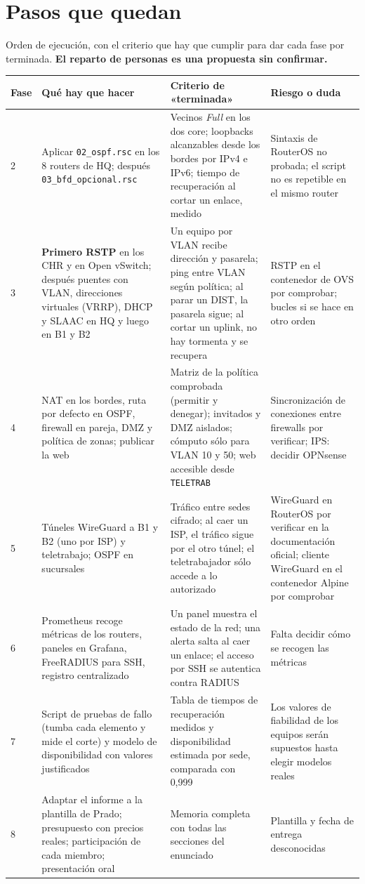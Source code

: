 \documentclass[11pt,a4paper]{article}
\newcommand{\cod}[1]{\texttt{#1}}
\begin{document}
\section{Pasos que quedan}\label{sec:pasos}
Orden de ejecución, con el criterio que hay que cumplir para dar cada fase por terminada. \textbf{El reparto de personas es una propuesta sin confirmar.}
\begingroup\footnotesize
\begin{longtable}{@{}p{1.2cm}p{5cm}p{6.6cm}p{3.7cm}@{}}
\toprule
\textbf{Fase} & \textbf{Qué hay que hacer} & \textbf{Criterio de «terminada»} & \textbf{Riesgo o duda}\\
\midrule
\endhead
2 & Aplicar \cod{02\_ospf.rsc} en los 8 routers de HQ; después \cod{03\_bfd\_opcional.rsc} & Vecinos \textit{Full} en los dos core; loopbacks alcanzables desde los bordes por IPv4 e IPv6; tiempo de recuperación al cortar un enlace, medido & Sintaxis de RouterOS no probada; el script no es repetible en el mismo router\\
3 & \textbf{Primero RSTP} en los CHR y en Open vSwitch; después puentes con VLAN, direcciones virtuales (VRRP), DHCP y SLAAC en HQ y luego en B1 y B2 & Un equipo por VLAN recibe dirección y pasarela; ping entre VLAN según política; al parar un DIST, la pasarela sigue; al cortar un uplink, no hay tormenta y se recupera & RSTP en el contenedor de OVS por comprobar; bucles si se hace en otro orden\\
4 & NAT en los bordes, ruta por defecto en OSPF, firewall en pareja, DMZ y política de zonas; publicar la web & Matriz de la política comprobada (permitir y denegar); invitados y DMZ aislados; cómputo sólo para VLAN 10 y 50; web accesible desde \cod{TELETRAB} & Sincronización de conexiones entre firewalls por verificar; IPS: decidir OPNsense\\
5 & Túneles WireGuard a B1 y B2 (uno por ISP) y teletrabajo; OSPF en sucursales & Tráfico entre sedes cifrado; al caer un ISP, el tráfico sigue por el otro túnel; el teletrabajador sólo accede a lo autorizado & WireGuard en RouterOS por verificar en la documentación oficial; cliente WireGuard en el contenedor Alpine por comprobar\\
6 & Prometheus recoge métricas de los routers, paneles en Grafana, FreeRADIUS para SSH, registro centralizado & Un panel muestra el estado de la red; una alerta salta al caer un enlace; el acceso por SSH se autentica contra RADIUS & Falta decidir cómo se recogen las métricas\\
7 & Script de pruebas de fallo (tumba cada elemento y mide el corte) y modelo de disponibilidad con valores justificados & Tabla de tiempos de recuperación medidos y disponibilidad estimada por sede, comparada con 0,999 & Los valores de fiabilidad de los equipos serán supuestos hasta elegir modelos reales\\
8 & Adaptar el informe a la plantilla de Prado; presupuesto con precios reales; participación de cada miembro; presentación oral & Memoria completa con todas las secciones del enunciado & Plantilla y fecha de entrega desconocidas\\
\bottomrule
\end{longtable}
\endgroup
\end{document}
